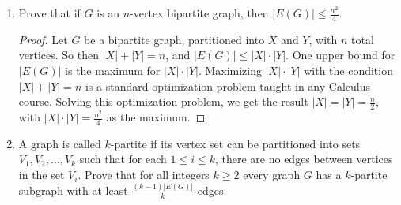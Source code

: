 \documentclass[12pt]{article}
\begin{document}
\begin{enumerate}
\begin{enumerate}
\begin{proof}
	Assume G is a graph, $\delta(G) = \lfloor (n-2)/2 \rfloor$ and $\Delta(G) \geq \lceil n/2 \rceil$. Assume towards contradiction that G has at least two connected components.\\
	\textbf{Case 1}: $n$ is even.\\
	Since $n$ is even, $n=2k$ for some $k\in\N$, and $\delta(G) = k-1$ and $\Delta(G) \geq k$. WLOG, let us consider two connected components of $G$, called $A$ and $B$, and let $A$ contain a vertex with the maximum degree. So $A$ must contain at least $k+1$ vertices. So then $B$ can at most contain $k-1$ vertices. So in $B$, the max degree a vertex can have is $k-2$, but this is less than $\delta(G)$.\contra\\\\
	\textbf{Case 2}: $n$ is odd.\\
	Since $n$ is odd, $n=2k+1$ for some $k\in\N$, and $\delta(G) = \lfloor (2k-1)/2 \rfloor=\lfloor k-(1/2) \rfloor = k-1$ and $\Delta(G) \geq \lceil (2k+1)/2 \rceil = \lceil k+(1/2) \rceil =k+1$. WLOG, let us consider two connected components of $G$, called $A$ and $B$, and let $A$ contain a vertex with the maximum degree. So $A$ must contain at least $k+2$ vertices. This means $B$ contains $k-1$ vertices. So the highest degree a vertex in $B$ can have is $k-2$, but this is less than $\delta(G)$. \contra
	
\end{proof}
\end{enumerate}
\medskip


\item Prove that if $G$ is an $n$-vertex bipartite graph, then $|E(G)| \leq \frac{n^2}{4}$.
\begin{proof}
	Let $G$ be a bipartite graph, partitioned into $X$ and $Y$, with $n$ total vertices. So then $|X|+|Y|=n$, and $|E(G)| \leq |X|\cdot|Y|$. One upper bound for $|E(G)|$ is the maximum for $|X|\cdot|Y|$. Maximizing $|X|\cdot|Y|$ with the condition $|X|+|Y|=n$ is a standard optimization problem taught in any Calculus course. Solving this optimization problem, we get the result $|X|=|Y|=\frac{n}{2}$, with $|X|\cdot|Y| = \frac{n^2}{4}$ as the maximum. 
\end{proof}
\medskip

\item A graph is called $k$-partite if its vertex set can be partitioned into sets $V_1, V_2, \ldots, V_k$ such that for each $1\leq i \leq k$, there are no edges between vertices in the set $V_i$. Prove that for all integers $k \geq 2$ every graph  $G$ has a $k$-partite subgraph with at least $\frac{(k-1)|E(G)|}{k}$ edges.




\end{enumerate}
\end{document}
